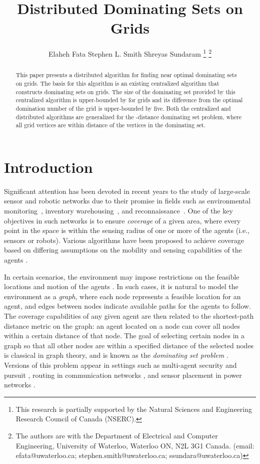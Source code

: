 \documentclass[letterpaper, 10pt, conference]{ieeeconf}
\title{Distributed Dominating Sets on Grids}
\author{Elaheh Fata \qquad Stephen L. Smith \qquad Shreyas Sundaram
\thanks{This research is partially
    supported by the Natural Sciences and Engineering Research Council
    of Canada (NSERC). } 
\thanks{The authors are with the Department of Electrical and
  Computer Engineering, University of Waterloo, Waterloo ON, N2L 3G1
  Canada. (email: efata@uwaterloo.ca;
  stephen.smith@uwaterloo.ca;  ssundara@uwaterloo.ca) }
}
\theoremstyle{definition}
\theoremstyle{remark}
\begin{document}
\maketitle
\thispagestyle{empty}
\pagestyle{empty}

\begin{abstract}
This paper presents a distributed algorithm for finding near optimal dominating sets on grids. The basis for this algorithm is an existing centralized algorithm that constructs dominating sets on grids. The size of the dominating set provided by this centralized algorithm is upper-bounded by  for  grids and its difference from the optimal domination number of the grid is upper-bounded by five. 
Both the centralized and distributed algorithms are generalized for the -distance dominating set problem, where all grid vertices are within distance  of the vertices in the dominating set.
\end{abstract}




\section{Introduction}
\label{sec:intro}

Significant attention has been devoted in recent years to the study of large-scale sensor and robotic networks due to their promise in fields such as environmental monitoring~\cite{NEL-DP-FL-RS-DMF-RD:07}, inventory warehousing~\cite{Guizzo08}, and reconnaissance~\cite{RWB-TWM-MAG-EPA:02}.  One of the key objectives in such networks is to ensure {\it coverage} of a given area, where every point in the space is within the sensing radius of one or more of the agents (i.e., sensors or robots).  Various algorithms have been proposed to achieve coverage based on differing assumptions on the mobility and sensing capabilities of the agents \cite{DistCtrlRobotNetw}.

In certain scenarios, the environment may impose restrictions on the feasible locations and motion of the agents \cite{SML:06}.  In such cases, it is natural to model the environment as a {\it graph}, where each node represents a feasible location for an agent, and edges between nodes indicate available paths for the agents to follow.  The coverage capabilities of any given agent are then related to the shortest-path distance metric on the graph: an agent located on a node can cover all nodes within a certain distance of that node.  The goal of selecting certain nodes in a graph so that all other nodes are within a specified distance of the selected nodes is classical in graph theory, and is known as the {\it dominating set problem} \cite{GJ'79}.  Versions of this problem appear in settings such as multi-agent security and pursuit \cite{Abbas12}, routing in communication networks \cite{Wu01}, and sensor placement in power networks \cite{Dorfling06}.
\end{document}
